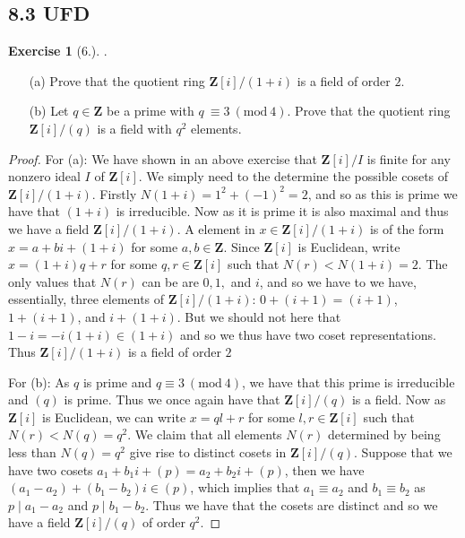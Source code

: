 \documentclass[9pt,reqno]{amsart}
\theoremstyle{definition}
\newtheorem{exercise}{Exercise}[section]
\newcommand{\zz}{\mathbf Z}
\newcommand{\Mod}[1]{\ (\mathrm{mod}\ #1)}
\begin{document}
\subsection{8.3 UFD}
\begin{exercise}[6.].
\begin{itemize}
	\item [(a)] Prove that the quotient ring $\zz[i]/(1+i)$ is a field of order $2$.
	\item [(b)] Let $q \in \zz$ be a prime with $q\ \equiv 3 \Mod{4}$. Prove that the quotient ring $\zz[i]/(q)$ is a field with $q^2$ elements. 
\end{itemize}
	\begin{proof} For (a): We have shown in an above exercise that $\zz[i]/I$ is finite for any nonzero ideal $I$ of $\zz[i]$. We simply need to the determine the possible cosets of $\zz[i]/(1+i)$. Firstly $N(1+i) = 1^2 + (-1)^2 = 2$, and so as this is prime we have that $(1+i)$ is irreducible. Now as it is prime it is also maximal and thus we have a field $\zz[i]/(1+i)$. A element in $x \in \zz[i] /(1+i)$ is of the form $x = a+bi + (1+i)$ for some $a, b \in \zz$.  Since $\zz[i]$ is Euclidean, write $x = (1+i)q + r$ for some $q, r \in \zz[i]$ such that $N(r) < N(1+i) = 2$. The only values that $N(r)$ can be are $0, 1,$ and $i$, and so we have to we have, essentially, three elements of $\zz[i]/(1+i)$: $0 + (i+1) = (i+1)$, $1 + (i+1)$, and $i + (1+i)$. But we should not here that $1-i = -i(1+i) \in (1+i)$ and so we thus have two coset representations. Thus $\zz[i]/(1+i)$ is a field of order $2$
			
			For (b): As $q$ is prime and $q \equiv 3 \Mod{4}$, we have that this prime is irreducible and $(q)$ is prime. Thus we once again have that $\zz[i]/(q)$ is a field. Now as $\zz[i]$ is Euclidean, we can write $x = ql + r$ for some $l, r \in \zz[i]$ such that $N(r) < N(q)= q^2$. We claim that all elements $N(r)$ determined by being less than $N(q) = q^2$ give rise to distinct cosets in $\zz[i]/(q)$. Suppose that we have two cosets $a_1 + b_1i + (p) = a_2 + b_2 i + (p)$, then we have $(a_1 -a_2) +(b_1-b_2)i \in (p)$, which implies that $a_1 \equiv a_2$ and $b_1 \equiv b_2$ as $p \mid a_1-a_2$ and $p\mid b_1- b_2 $. Thus we have that the cosets are distinct and so we have a field $\zz[i]/ (q)$ of order $q^2$.  
		
	\end{proof}
\end{exercise}
\end{document}
